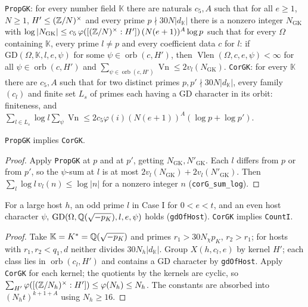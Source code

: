 \begin{definition}\label{sha:propgk}
\texttt{PropGK}: for every number field $\mathbb K$ there are naturals $c_5,A$ such that for
all $e\ge1$, $N\ge1$, $H'\le(\mathbb{Z}/N)^{\times}$ and every prime $p\nmid30N|d_{\mathbb K}|$ there is
a nonzero integer $N_{\mathrm{GK}}$ with
$\log|N_{\mathrm{GK}}|\le c_5\,\varphi([(\mathbb{Z}/N)^{\times}:H'])\,(N(e+1))^A\log p$ such that for
every $\Omega$ containing $\mathbb K$, every prime $l\ne p$ and every coefficient data $c$
for $l$: if $\mathrm{GD}(\Omega,\mathbb K,l,e,\psi)$ for some $\psi\in\operatorname{orb}(c,H')$,
then $\operatorname{Vlen}(\Omega,c,e,\psi)<\infty$ for all $\psi\in\operatorname{orb}(c,H')$ and
$\sum_{\psi\in\operatorname{orb}(c,H')}\operatorname{Vn}\le2v_l(N_{\mathrm{GK}})$.
\texttt{CorGK}: for every $\mathbb K$ there are $c_5,A$ such that for two distinct primes
$p,p'\nmid30N|d_{\mathbb K}|$, every family $(c_l)$ and finite set $L_s$ of primes each having a
$\mathrm{GD}$ character in its orbit: finiteness, and
$\sum_{l\in L_s}\log l\sum_{\psi}\operatorname{Vn}\le2c_5\varphi(i)(N(e+1))^A(\log p+\log p')$.
\end{definition}

\begin{lemma}\label{sha:corgk}
\texttt{PropGK} implies \texttt{CorGK}.
\end{lemma}
\begin{proof}
Apply \texttt{PropGK} at $p$ and at $p'$, getting $N_{\mathrm{GK}},N'_{\mathrm{GK}}$. Each $l$
differs from $p$ or from $p'$, so the $\psi$-sum at $l$ is at most
$2v_l(N_{\mathrm{GK}})+2v_l(N'_{\mathrm{GK}})$. Then
$\sum_l\log l\,v_l(n)\le\log|n|$ for a nonzero integer $n$ (\texttt{corG\_sum\_log}).
\end{proof}

\begin{theorem}\label{sha:counti}
For a large host $h$, an odd prime $l$ in Case I for $0<e<t$, and an even host character
$\psi$, $\mathrm{GD}(\Omega,\mathbb{Q}(\sqrt{-p_K}),l,e,\psi)$ holds (\texttt{gdOfHost}).
\texttt{CorGK} implies \texttt{CountI}.
\end{theorem}
\begin{proof}
Take $\mathbb K=K^*=\mathbb{Q}(\sqrt{-p_K})$ and primes $r_1>30N_{\chi} p_K$, $r_2>r_1$; for hosts with
$r_1,r_2<q_1,d$ neither divides $30N_h|d_{\mathbb K}|$. Group $X(h,c_l,e)$ by kernel $H'$;
each class lies in $\operatorname{orb}(c_l,H')$ and contains a $\mathrm{GD}$ character by
\texttt{gdOfHost}. Apply \texttt{CorGK} for each kernel; the quotients by the kernels are
cyclic, so $\sum_{H'}\varphi([(\mathbb{Z}/N_h)^{\times}:H'])\le\varphi(N_h)\le N_h$. The constants are
absorbed into $(N_ht)^{k+1+A}$ using $N_h\ge16$.
\end{proof}


